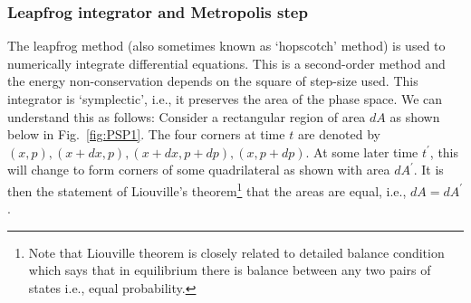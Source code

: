 \documentclass[letter,11pt]{article}
\begin{document}
\subsubsection{Leapfrog integrator and Metropolis step}
The leapfrog method (also sometimes known as `hopscotch' method) 
is used to numerically integrate differential equations. This is a second-order 
method and the energy non-conservation depends on the square of step-size used. This integrator is `symplectic', i.e., it preserves the 
area of the phase space. We can understand this as follows: 
Consider a rectangular region of area $dA$ as shown below in Fig.~\ref{fig:PSP1}. The four corners at time $t$ are denoted by $(x, p), (x+dx, p), (x+dx, p+dp),(x, p+dp)$. At some later time $t^{\prime}$, this will change to form corners of some quadrilateral as shown with area $dA^{\prime}$. It is then the statement of Liouville's theorem\footnote{Note that Liouville theorem is closely related to detailed balance condition which says that in equilibrium there is balance between any two pairs of states i.e., equal probability.} that the areas are equal, i.e., $dA = dA^{\prime}$. 
\end{document}
